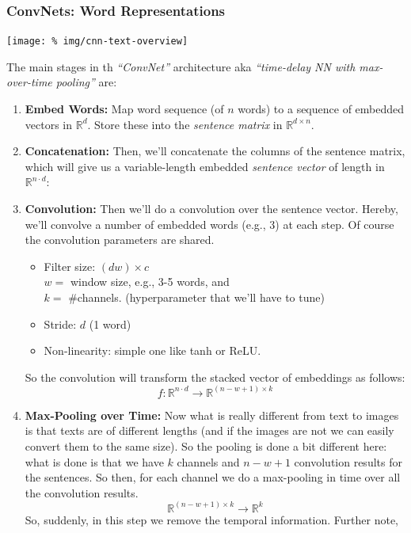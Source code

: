 \documentclass[a2paper,8pt]{extarticle}
\newcommand{\R}{\mathbb{R}}
\begin{document}
\begin{landscape}
\begin{multicols*}{7}
\subsubsection{ConvNets: Word Representations}

\begin{center}
  \texttt{[image: \%
img/cnn-text-overview]}
\end{center}

The main stages in th \emph{``ConvNet''} architecture aka
\emph{``time-delay NN with max-over-time pooling''} are:

\begin{enumerate}
  \item \textbf{Embed Words:} Map word sequence (of $n$ words) to a sequence of
  embedded vectors in $\R^d$. Store these into the \emph{sentence matrix} in
  $\R^{d\times n}$.
  \item \textbf{Concatenation:} Then, we'll concatenate the columns of the
  sentence matrix, which will give us a variable-length embedded \emph{sentence
  vector} of length in $\R^{n\cdot d}$:
  \item \textbf{Convolution:} Then we'll do a convolution over the sentence
  vector. Hereby, we'll convolve a number of embedded words (e.g., 3) at each
  step. Of course the convolution parameters are shared.
  \begin{itemize}
    \item Filter size: $(d w)\times c$
    \\$w=$ window size, e.g., 3-5 words, and\\ 
    $k=$ \#channels. (hyperparameter that we'll have to tune)
    \item Stride: $d$ (1 word)
    \item Non-linearity: simple one like tanh or ReLU. 
  \end{itemize}
  So the convolution will transform the stacked vector of embeddings as follows:
  \[
  f\colon \R^{n\cdot d}\to\R^{(n-w+1)\times k}
  \]
  \item \textbf{Max-Pooling over Time:} Now what is really different from text
  to images is that texts are of different lengths (and if the images are not we
  can easily convert them to the same size). So the pooling is done a bit
  different here: what is done is that we have $k$ channels and $n-w+1$
  convolution results for the sentences. So then, for each channel we do a
  max-pooling in time over all the convolution results.
  \[
  \R^{(n-w+1)\times k}\to\R^k
  \]
  So, suddenly, in this step we remove the temporal information. Further note,

\end{enumerate}
\end{multicols*}
\end{landscape}
\end{document}
